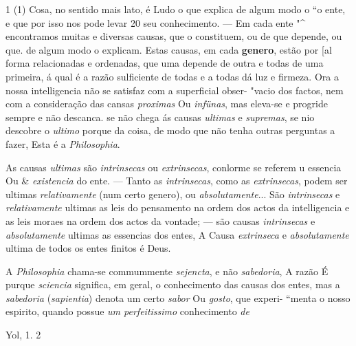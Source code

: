 1 (1) Cosa, no sentido mais lato, é Ludo o que explica de algum modo o “o ente, e que por isso nos pode levar 20 seu conhecimento. --- Em cada ente "\textasciicircum{} encontramos muitas e diversas causas, que o constituem, ou de que depende, ou que. de algum modo o explicam. Estas causas, em cada \textbf{genero}, estão por [al forma relacionadas e ordenadas, que uma depende de outra e todas de uma primeira, á qual é a razão sulficiente de todas e a todas dá luz e firmeza. Ora a nossa intelligencia não se satisfaz com a superficial obser- "vacio dos factos, nem com a consideração das cansas \emph{proximas} Ou \emph{infünas}, mas eleva-se e progride sempre e não descanca. se não chega ás causas \emph{ultimas} e \emph{supremas}, se nio descobre o \emph{ultimo} porque da coisa, de modo que não tenha outras perguntas a fazer, Esta é a \emph{Philosophia}.

As causas \emph{ultimas} são \emph{intrinsecas} ou \emph{extrinsecas}, conlorme se referem u essencia Ou \& \emph{existencia} do ente. --- Tanto as \emph{intrinsecas}, como as \emph{extrinsecas}, podem ser ultimas \emph{relativamente} (num certo genero), ou \emph{absolutamente}... São \emph{intrinsecas} e \emph{relativamente} ultimas as leis do pensamento na ordem dos actos da intelligencia e as leis moraes na ordem dos actos da vontade; --- são causas \emph{intrinsecas} e \emph{absolutamente} ultimas as essencias dos entes, A Causa \emph{extrinseca} e \emph{absolutamente} ultima de todos os entes finitos é Deus.

A \emph{Philosophia} chama-se commummente \emph{sejencta}, e não \emph{sabedoria}, A razão É purque \emph{sciencia} significa, em geral, o conhecimento das causas dos entes, mas a \emph{sabedoria} (\emph{sapientia}) denota um certo \emph{sabor} Ou \emph{gosto}, que experi- “menta o nosso espirito, quando possue \emph{um perfeitissimo} conhecimento \emph{de}

Yol, 1. 2

